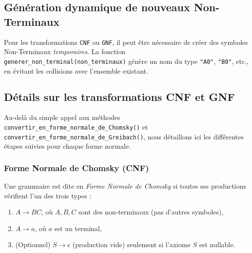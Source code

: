 \documentclass[a4paper,12pt]{article}
\begin{document}
\subsection{Génération dynamique de nouveaux Non-Terminaux}
Pour les transformations \texttt{CNF} ou \texttt{GNF}, il peut être nécessaire de créer des symboles Non-Terminaux \emph{temporaires}. La fonction \texttt{generer\_non\_terminal(non\_terminaux)} génère un nom du type \texttt{"A0"}, \texttt{"B0"}, etc., en évitant les collisions avec l’ensemble existant.

\subsection{Détails sur les transformations CNF et GNF}
\label{subsec:details-cnf-gnf}

Au-delà du simple appel aux méthodes \texttt{convertir\_en\_forme\_normale\_de\_Chomsky()} et \texttt{convertir\_en\_forme\_normale\_de\_Greibach()}, nous détaillons ici les différentes étapes suivies pour chaque forme normale.

\subsubsection{Forme Normale de Chomsky (CNF)}

Une grammaire est dite en \emph{Forme Normale de Chomsky} si toutes ses productions vérifient l’un des trois types :
\begin{enumerate}
    \item \(A \to BC\), où \(A, B, C\) sont des non-terminaux (pas d’autres symboles),
    \item \(A \to a\), où \(a\) est un terminal,
    \item (Optionnel) \(S \to \epsilon\) (production vide) seulement si l’axiome \(S\) est nullable.
\end{enumerate}
\end{document}
